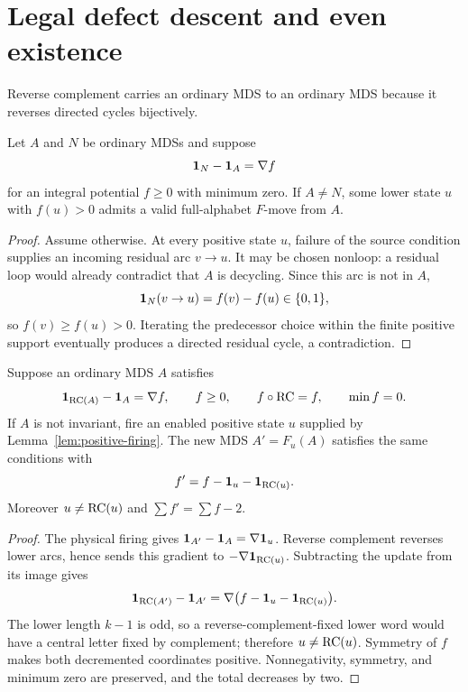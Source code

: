 \section{Legal defect descent and even existence}
\label{sec:even}

Reverse complement carries an ordinary MDS to an ordinary MDS because it
reverses directed cycles bijectively.

\begin{lemma}
\label{lem:positive-firing}
Let $A$ and $N$ be ordinary MDSs and suppose
\[
  \mathbf 1_N-\mathbf 1_A=\nabla f
\]
for an integral potential $f\geq0$ with minimum zero.  If $A\neq N$, some
lower state $u$ with $f(u)>0$ admits a valid full-alphabet $F$-move from $A$.
\end{lemma}

\begin{proof}
Assume otherwise.  At every positive state $u$, failure of the source
condition supplies an incoming residual arc $v\to u$.  It may be chosen
nonloop: a residual loop would already contradict that $A$ is decycling.
Since this arc is not in $A$,
\[
  \mathbf 1_N(v\to u)=f(v)-f(u)\in\{0,1\},
\]
so $f(v)\geq f(u)>0$.  Iterating the predecessor choice within the finite
positive support eventually produces a directed residual cycle, a
contradiction.
\end{proof}

\begin{lemma}
\label{lem:paired-update}
Suppose an ordinary MDS $A$ satisfies
\[
  \mathbf 1_{\operatorname{RC}(A)}-\mathbf 1_A=\nabla f,\qquad
  f\geq0,\qquad f\circ\operatorname{RC}=f,\qquad \min f=0.
\]
If $A$ is not invariant, fire an enabled positive state $u$ supplied by
Lemma~\ref{lem:positive-firing}.  The new MDS $A'=F_u(A)$ satisfies the same
conditions with
\[
  f'=f-\mathbf 1_u-\mathbf 1_{\operatorname{RC}(u)}.
\]
Moreover $u\neq\operatorname{RC}(u)$ and $\sum f'=\sum f-2$.
\end{lemma}

\begin{proof}
The physical firing gives $\mathbf 1_{A'}-\mathbf 1_A=\nabla\mathbf 1_u$.  Reverse
complement reverses lower arcs, hence sends this gradient to
$-\nabla\mathbf 1_{\operatorname{RC}(u)}$.  Subtracting the update from its image gives
\[
  \mathbf 1_{\operatorname{RC}(A')}-\mathbf 1_{A'}
  =\nabla\bigl(f-\mathbf 1_u-\mathbf 1_{\operatorname{RC}(u)}\bigr).
\]
The lower length $k-1$ is odd, so a reverse-complement-fixed lower word would
have a central letter fixed by complement; therefore $u\neq\operatorname{RC}(u)$.  Symmetry
of $f$ makes both decremented coordinates positive.  Nonnegativity,
symmetry, and minimum zero are preserved, and the total decreases by two.
\end{proof}

